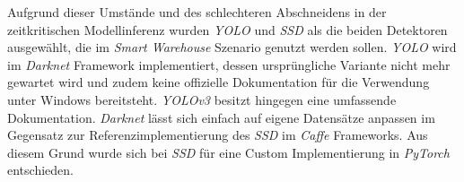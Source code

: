 Aufgrund dieser Umstände und des schlechteren Abschneidens in der zeitkritischen Modellinferenz wurden \textit{YOLO} und \textit{SSD} als die beiden Detektoren ausgewählt, die im \textit{Smart Warehouse} Szenario genutzt werden sollen. \textit{YOLO} wird im \textit{Darknet} Framework implementiert, dessen ursprüngliche Variante nicht mehr gewartet wird und zudem keine offizielle Dokumentation für die Verwendung unter Windows bereitsteht. \textit{YOLOv3} besitzt hingegen eine umfassende Dokumentation. \textit{Darknet} lässt sich einfach auf eigene Datensätze anpassen im Gegensatz zur Referenzimplementierung des \textit{SSD} im \textit{Caffe} Frameworks. Aus diesem Grund wurde sich bei \textit{SSD} für eine Custom Implementierung in \textit{PyTorch} entschieden.